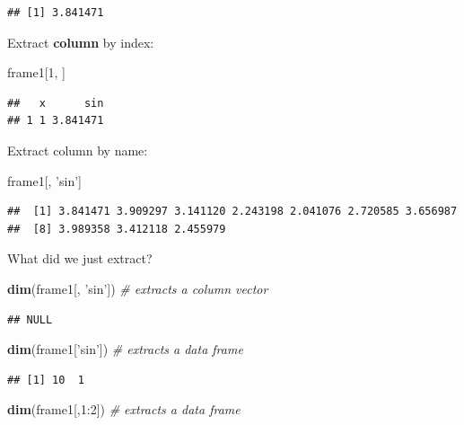\documentclass[]{book}
\newenvironment{Shaded}{\begin{snugshade}}{\end{snugshade}}
\newcommand{\KeywordTok}[1]{\textcolor[rgb]{0.13,0.29,0.53}{\textbf{{#1}}}}
\newcommand{\DecValTok}[1]{\textcolor[rgb]{0.00,0.00,0.81}{{#1}}}
\newcommand{\StringTok}[1]{\textcolor[rgb]{0.31,0.60,0.02}{{#1}}}
\newcommand{\CommentTok}[1]{\textcolor[rgb]{0.56,0.35,0.01}{\textit{{#1}}}}
\newcommand{\NormalTok}[1]{{#1}}
\theoremstyle{definition}
\theoremstyle{definition}
\theoremstyle{remark}
\begin{document}
\begin{verbatim}
## [1] 3.841471
\end{verbatim}

Extract \textbf{column} by index:

\begin{Shaded}
\begin{Highlighting}[]
\NormalTok{frame1[}\DecValTok{1}\NormalTok{, ]                             }
\end{Highlighting}
\end{Shaded}

\begin{verbatim}
##   x      sin
## 1 1 3.841471
\end{verbatim}

Extract column by name:

\begin{Shaded}
\begin{Highlighting}[]
\NormalTok{frame1[, }\StringTok{'sin'}\NormalTok{]}
\end{Highlighting}
\end{Shaded}

\begin{verbatim}
##  [1] 3.841471 3.909297 3.141120 2.243198 2.041076 2.720585 3.656987
##  [8] 3.989358 3.412118 2.455979
\end{verbatim}

What did we just extract?

\begin{Shaded}
\begin{Highlighting}[]
\KeywordTok{dim}\NormalTok{(frame1[, }\StringTok{'sin'}\NormalTok{])  }\CommentTok{# extracts a column vector}
\end{Highlighting}
\end{Shaded}

\begin{verbatim}
## NULL
\end{verbatim}

\begin{Shaded}
\begin{Highlighting}[]
\KeywordTok{dim}\NormalTok{(frame1[}\StringTok{'sin'}\NormalTok{])  }\CommentTok{# extracts a data frame}
\end{Highlighting}
\end{Shaded}

\begin{verbatim}
## [1] 10  1
\end{verbatim}

\begin{Shaded}
\begin{Highlighting}[]
\KeywordTok{dim}\NormalTok{(frame1[,}\DecValTok{1}\NormalTok{:}\DecValTok{2}\NormalTok{])  }\CommentTok{# extracts a data frame}
\end{Highlighting}
\end{Shaded}
\end{document}

